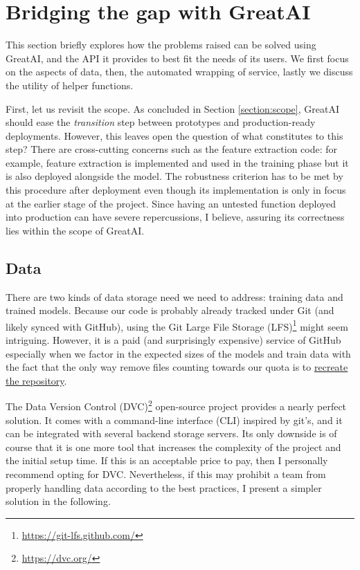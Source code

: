 \section{Bridging \textbf{the gap} with GreatAI}

This section briefly explores how the problems raised can be solved using GreatAI, and the API it provides to best fit the needs of its users. We first focus on the aspects of data, then, the automated wrapping of service, lastly we discuss the utility of helper functions.

First, let us revisit the scope. As concluded in Section \ref{section:scope}, GreatAI should ease the \textit{transition} step between prototypes and production-ready deployments. However, this leaves open the question of what constitutes to this step? There are cross-cutting concerns such as the feature extraction code: for example, feature extraction is implemented and used in the training phase but it is also deployed alongside the model. The robustness criterion has to be met by this procedure after deployment even though its implementation is only in focus at the earlier stage of the project. Since having an untested function deployed into production can have severe repercussions, I believe, assuring its correctness lies within the scope of GreatAI.

\subsection{Data}

There are two kinds of data storage need we need to address: training data and trained models. Because our code is probably already tracked under Git (and likely synced with GitHub), using the Git Large File Storage (LFS)\footnote{\href{https://git-lfs.github.com/}{https://git-lfs.github.com/}} might seem intriguing. However, it is a paid (and surprisingly expensive) service of GitHub especially when we factor in the expected sizes of the models and train data with the fact that the only way remove files counting towards our quota is to \href{https://docs.github.com/en/repositories/working-with-files/managing-large-files/removing-files-from-git-large-file-storage#git-lfs-objects-in-your-repository}{recreate the repository}.

The Data Version Control (DVC)\footnote{\href{https://dvc.org/}{https://dvc.org/}} open-source project provides a nearly perfect solution. It comes with a command-line interface (CLI) inspired by git's, and it can be integrated with several backend storage servers. Its only downside is of course that it is one more tool that increases the complexity of the project and the initial setup time. If this is an acceptable price to pay, then I personally recommend opting for DVC. Nevertheless, if this may prohibit a team from properly handling data according to the best practices, I present a simpler solution in the following. 

